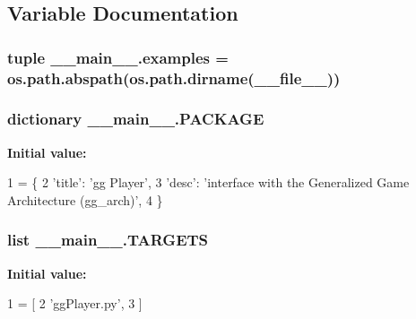 \subsection{Variable Documentation}
\hypertarget{namespace____main_____a7f39fde1632edc2f2ae4590e560d604c}{
\subsubsection[{examples}]{\setlength{\rightskip}{0pt plus 5cm}tuple \-\_\-\-\_\-main\-\_\-\-\_\-.\-examples = os.\-path.\-abspath(os.\-path.\-dirname(\-\_\-\-\_\-file\-\_\-\-\_\-))}}\label{namespace____main_____a7f39fde1632edc2f2ae4590e560d604c}
\hypertarget{namespace____main_____a8b036a60a3e9d527d6a490f0cbe750e6}{
\subsubsection[{P\-A\-C\-K\-A\-G\-E}]{\setlength{\rightskip}{0pt plus 5cm}dictionary \-\_\-\-\_\-main\-\_\-\-\_\-.\-P\-A\-C\-K\-A\-G\-E}}\label{namespace____main_____a8b036a60a3e9d527d6a490f0cbe750e6}
{\bfseries Initial value\-:}
\begin{DoxyCode}
1 = \{
2     \textcolor{stringliteral}{'title'}: \textcolor{stringliteral}{'gg Player'},
3     \textcolor{stringliteral}{'desc'}: \textcolor{stringliteral}{'interface with the Generalized Game Architecture (gg\_arch)'},
4 \}
\end{DoxyCode}
\hypertarget{namespace____main_____a8e28c558f02e44c4b181d5da3e284226}{
\subsubsection[{T\-A\-R\-G\-E\-T\-S}]{\setlength{\rightskip}{0pt plus 5cm}list \-\_\-\-\_\-main\-\_\-\-\_\-.\-T\-A\-R\-G\-E\-T\-S}}\label{namespace____main_____a8e28c558f02e44c4b181d5da3e284226}
{\bfseries Initial value\-:}
\begin{DoxyCode}
1 = [
2     \textcolor{stringliteral}{'ggPlayer.py'},
3 ]
\end{DoxyCode}
